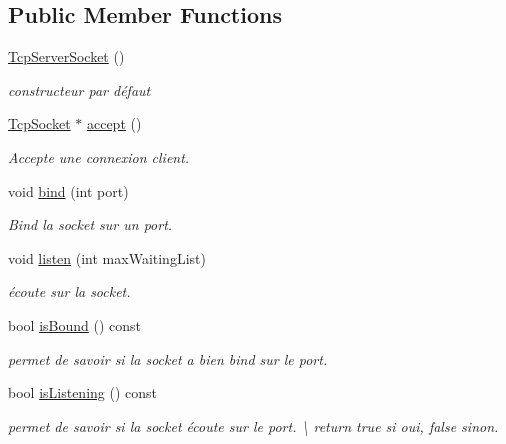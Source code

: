 \subsection*{Public Member Functions}
\begin{DoxyCompactItemize}
\item 
\hypertarget{classmognetwork_1_1_tcp_server_socket_a152822e1e60c7085578bc83cdfd00bbf}{\hyperlink{classmognetwork_1_1_tcp_server_socket_a152822e1e60c7085578bc83cdfd00bbf}{Tcp\-Server\-Socket} ()}\label{classmognetwork_1_1_tcp_server_socket_a152822e1e60c7085578bc83cdfd00bbf}

\begin{DoxyCompactList}\small\item\em constructeur par défaut \end{DoxyCompactList}\item 
\hyperlink{classmognetwork_1_1_tcp_socket}{Tcp\-Socket} $\ast$ \hyperlink{classmognetwork_1_1_tcp_server_socket_a53a7e104d2024c5d8742d8dc34e7f3a1}{accept} ()
\begin{DoxyCompactList}\small\item\em Accepte une connexion client. \end{DoxyCompactList}\item 
void \hyperlink{classmognetwork_1_1_tcp_server_socket_a4b105d5de7327704053aa1a8cd63867c}{bind} (int port)
\begin{DoxyCompactList}\small\item\em Bind la socket sur un port. \end{DoxyCompactList}\item 
void \hyperlink{classmognetwork_1_1_tcp_server_socket_ae7be66e332d204dcec82e252e86231eb}{listen} (int max\-Waiting\-List)
\begin{DoxyCompactList}\small\item\em écoute sur la socket. \end{DoxyCompactList}\item 
bool \hyperlink{classmognetwork_1_1_tcp_server_socket_a982378d2a52f5b0c0935887c30dc1304}{is\-Bound} () const 
\begin{DoxyCompactList}\small\item\em permet de savoir si la socket a bien bind sur le port. \end{DoxyCompactList}\item 
\hypertarget{classmognetwork_1_1_tcp_server_socket_a38a7a113a0d5a541304ac4011229e091}{bool \hyperlink{classmognetwork_1_1_tcp_server_socket_a38a7a113a0d5a541304ac4011229e091}{is\-Listening} () const }\label{classmognetwork_1_1_tcp_server_socket_a38a7a113a0d5a541304ac4011229e091}

\begin{DoxyCompactList}\small\item\em permet de savoir si la socket écoute sur le port. \textbackslash{} return true si oui, false sinon. \end{DoxyCompactList}\end{DoxyCompactItemize}
